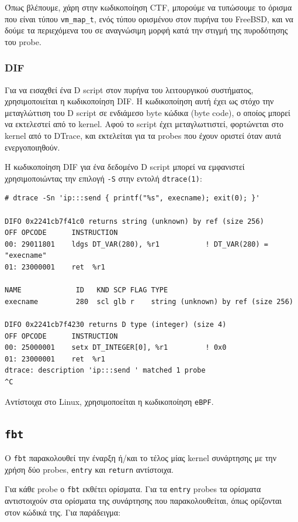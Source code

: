 \documentclass[12pt]{article}
\begin{document}
Όπως βλέπουμε, χάρη στην κωδικοποίηση CTF, μπορούμε να τυπώσουμε το όρισμα που
είναι τύπου \lstinline{vm_map_t}, ενός τύπου ορισμένου στον πυρήνα του FreeBSD,
και να δούμε τα περιεχόμενα του σε αναγνώσιμη μορφή κατά την στιγμή της
πυροδότησης του probe.

\subsubsection{DIF}

Για να εισαχθεί ένα D script στον πυρήνα του λειτουργικού συστήματος,
χρησιμοποιείται η κωδικοποίηση DIF. Η κωδικοποίηση αυτή έχει ως στόχο την
μεταγλώττιση του D script σε ενδιάμεσο byte κώδικα (byte code), ο οποίος μπορεί
να εκτελεστεί από το kernel. Αφού το script έχει μεταγλωττιστεί, φορτώνεται στο
kernel από το DTrace, και εκτελείται για τα probes που έχουν οριστεί όταν αυτά
ενεργοποιηθούν.

Η κωδικοποίηση DIF για ένα δεδομένο D script μπορεί να εμφανιστεί
χρησιμοποιώντας την επιλογή \lstinline{-S} στην εντολή \lstinline{dtrace(1)}:

\begin{lstlisting}
# dtrace -Sn 'ip:::send { printf("%s", execname); exit(0); }'

DIFO 0x2241cb7f41c0 returns string (unknown) by ref (size 256)
OFF OPCODE      INSTRUCTION
00: 29011801    ldgs DT_VAR(280), %r1           ! DT_VAR(280) = "execname"
01: 23000001    ret  %r1

NAME             ID   KND SCP FLAG TYPE
execname         280  scl glb r    string (unknown) by ref (size 256)

DIFO 0x2241cb7f4230 returns D type (integer) (size 4)
OFF OPCODE      INSTRUCTION
00: 25000001    setx DT_INTEGER[0], %r1         ! 0x0
01: 23000001    ret  %r1
dtrace: description 'ip:::send ' matched 1 probe
^C
\end{lstlisting}

Αντίστοιχα στο Linux, χρησιμοποείται η κωδικοποίηση \lstinline{eBPF}.

\subsection{\lstinline{fbt}} \label{fbt}

Ο \lstinline{fbt} παρακολουθεί την έναρξη ή/και το τέλος μίας kernel συνάρτησης με την
χρήση δύο probes, \lstinline{entry} και \lstinline{return} αντίστοιχα.

Για κάθε probe ο \lstinline{fbt} εκθέτει ορίσματα. Για τα \lstinline{entry} probes τα
ορίσματα αντιστοιχούν στα ορίσματα της συνάρτησης που παρακολουθείται, όπως
ορίζονται στον κώδικά της. Για παράδειγμα:
\end{document}
